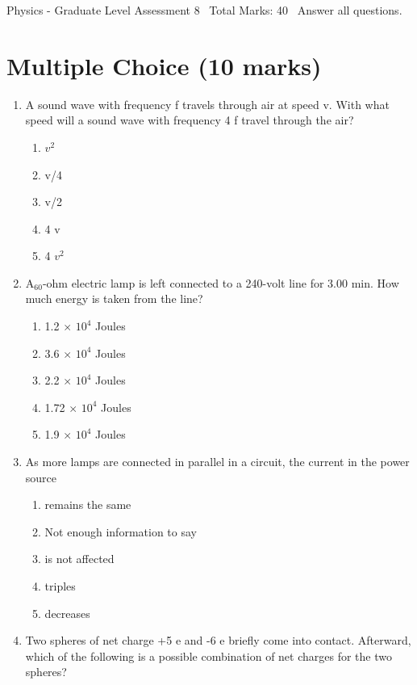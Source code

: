 \documentclass[12pt]{article}
\begin{document}
\begin{center}
Physics - Graduate Level Assessment 8 \
Total Marks: 40 \
Answer all questions.
\end{center}

\section*{Multiple Choice (10 marks)}
\begin{enumerate}[label=\arabic*.]
\item A sound wave with frequency f travels through air at speed v. With what speed will a sound wave with frequency 4 f travel through the air?
\begin{enumerate}[label=(\alph*)]
    \item $v^2$
    \item v/4
    \item v/2
    \item 4 v
    \item 4 $v^2$
\end{enumerate}
\item A$_{60}$-ohm electric lamp is left connected to a 240-volt line for 3.00 min. How much energy is taken from the line?
\begin{enumerate}[label=(\alph*)]
    \item 1.2 \ensuremath{\times} $10^4$ Joules
    \item 3.6 \ensuremath{\times} $10^4$ Joules
    \item 2.2 \ensuremath{\times} $10^4$ Joules
    \item 1.72 \ensuremath{\times} $10^4$ Joules
    \item 1.9 \ensuremath{\times} $10^4$ Joules
\end{enumerate}
\item As more lamps are connected in parallel in a circuit, the current in the power source
\begin{enumerate}[label=(\alph*)]
    \item remains the same
    \item Not enough information to say
    \item is not affected
    \item triples
    \item decreases
\end{enumerate}
\item Two spheres of net charge +5 e and -6 e briefly come into contact. Afterward, which of the following is a possible combination of net charges for the two spheres?

\end{enumerate}
\end{document}
